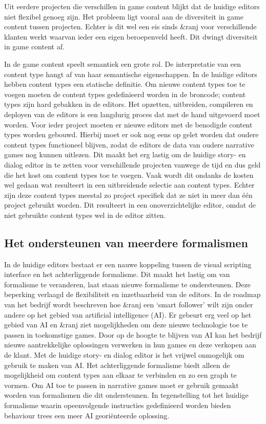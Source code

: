 Uit eerdere projecten die verschillen in game content blijkt dat de huidige editors niet flexibel genoeg zijn. Het probleem ligt vooral aan de diversiteit in game content tussen projecten. Echter is dit wel een eis sinds \&ranj voor verschillende klanten werkt waarvan ieder een eigen beroepenveld heeft. Dit dwingt diversiteit in game content af.

In de game content speelt semantiek een grote rol. De interpretatie van een content type hangt af van haar semantische eigenschappen. In de huidige editors hebben content types een statische definitie. Om nieuwe content types toe te voegen moeten de content types gedefinieerd worden in de broncode; content types zijn hard gebakken in de editors. Het opzetten, uitbreiden, compileren en deployen van de editors is een langdurig proces dat met de hand uitgevoerd moet worden. Voor ieder project moeten er nieuwe editors met de benodigde content types worden gebouwd. Hierbij moet er ook nog eens op gelet worden dat oudere content types functioneel blijven, zodat de editors de data van oudere narrative games nog kunnen uitlezen. Dit maakt het erg lastig om de huidige story- en dialog editor in te zetten voor verschillende projecten vanwege de tijd en dus geld die het kost om content types toe te voegen. Vaak wordt dit ondanks de kosten wel gedaan wat resulteert in een uitbreidende selectie aan content types. Echter zijn deze content types meestal zo project specifiek dat ze niet in meer dan één project gebruikt worden. Dit resulteert in een onoverzichtelijke editor, omdat de niet gebruikte content types wel in de editor zitten.

\subsection{Het ondersteunen van meerdere formalismen}
In de huidige editors bestaat er een nauwe koppeling tussen de visual scripting interface en het achterliggende formalisme. Dit maakt het lastig om van formalisme te veranderen, laat staan nieuwe formalisme te ondersteunen. Deze beperking verlaagd de flexibiliteit en inzetbaarheid van de editors. In de roadmap van het bedrijf wordt beschreven hoe \&ranj een ‘smart follower’ wilt zijn onder andere op het gebied van artificial intelligence (AI). Er gebeurt erg veel op het gebied van AI en \&ranj ziet mogelijkheden om deze nieuwe technologie toe te passen in toekomstige games. Door op de hoogte te blijven van AI kan het bedrijf nieuwe aantrekkelijke oplossingen verwerken in hun games en deze verkopen aan de klant. Met de huidige story- en dialog editor is het vrijwel onmogelijk om gebruik te maken van AI. Het achterliggende formalisme biedt alleen de mogelijkheid om content types aan elkaar te verbinden en zo een graph te vormen. Om AI toe te passen in narrative games moet er gebruik gemaakt worden van formalismen die dit ondersteunen. In tegenstelling tot het huidige formalisme waarin opeenvolgende instructies gedefinieerd worden bieden behaviour trees een meer AI georiënteerde oplossing\cite{Pizzi}\cite{Lim2010}.

